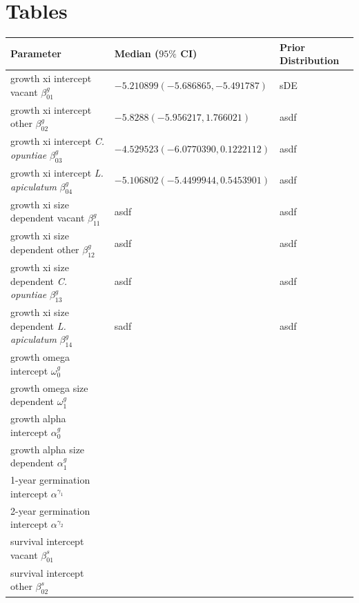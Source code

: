 \documentclass[11pt]{article}
\begin{document}
\newpage{}

\section*{Tables}
\renewcommand{\thetable}{\arabic{table}}
\setcounter{table}{0}

\renewcommand{\thetable}{\arabic{table}}
\setcounter{table}{0}

  \begin{table}[]
  \begin{tabular}{l|l|l}
    \textbf{Parameter} & \textbf{Median ($95\%$ CI)} & \textbf{Prior Distribution} \\
    \hline
    growth xi intercept vacant $\beta_{01}^g$ & $-5.210899 (-5.686865, -5.491787)$ & sDE\\
    growth xi intercept other $\beta_{02}^g$ & $-5.8288 (-5.956217, 1.766021) $&asdf \\
    growth xi intercept \textit{C. opuntiae} $\beta_{03}^g$ & $-4.529523 (-6.0770390, 0.1222112)$ & asdf\\
    growth xi intercept \textit{L. apiculatum} $\beta_{04}^g$ & $-5.106802 (-5.4499944, 0.5453901)$ & asdf\\
    growth xi size dependent vacant $\beta_{11}^g$ & asdf&asdf \\
    growth xi size dependent other $\beta_{12}^g$ & asdf&asdf \\
    growth xi size dependent \textit{C. opuntiae} $\beta_{13}^g$ & asdf&asdf \\
    growth xi size dependent \textit{L. apiculatum} $\beta_{14}^g$ &sadf &asdf \\
    growth omega intercept $\omega_0^g$ & & \\
    growth omega size dependent $\omega_1^g$ & & \\
    growth alpha intercept $\alpha_0^g$ & & \\
    growth alpha size dependent $\alpha_1^g$ & & \\
    \hline
    1-year germination intercept $\alpha^{\gamma_1}$ & & \\
    2-year germination intercept $\alpha^{\gamma_2}$ & & \\
    \hline
    survival intercept vacant $\beta_{01}^s$ & & \\
    survival intercept other $\beta_{02}^s$ & & \\

\end{tabular}
\end{table}
\end{document}

